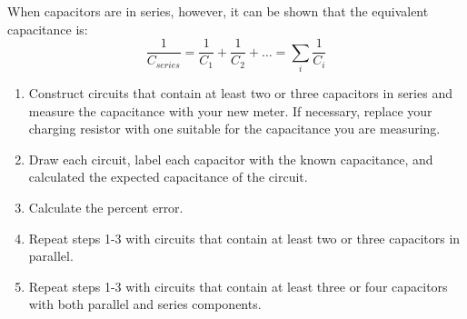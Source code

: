 \documentclass[]{article}
\begin{document}
When capacitors are in series, however, it  can be shown that the equivalent capacitance is:
\begin{equation*}
\frac{1}{C_{series}} = \frac{1}{C_1} + \frac{1}{C_2} + \dots = \sum_i \frac{1}{C_i}
\end{equation*}

\begin{enumerate}
	\item Construct circuits that contain at least two or three capacitors in series and measure the capacitance with your new meter.  If necessary, replace your charging resistor with one suitable for the capacitance you are measuring.
	
	\item Draw each circuit, label each capacitor with the known capacitance, and calculated the expected capacitance of the circuit.
		
	\item Calculate the percent error.
	
	\item Repeat steps 1-3 with circuits that contain at least two or three capacitors in parallel.
	
	\item Repeat steps 1-3 with circuits that contain at least three or four capacitors with both parallel and series components.
	
\end{enumerate}
\end{document}
